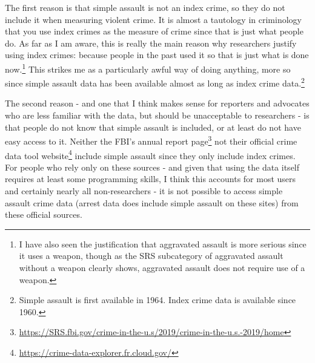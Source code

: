 \documentclass[
]{krantz}
\renewcommand{\href}[2]{#2\footnote{\url{#1}}}
\begin{document}
The first reason is that simple assault is not an index
crime, so they do not include it when measuring violent
crime. It is almost a tautology in criminology that you use
index crimes as the measure of crime since that is just what
people do. As far as I am aware, this is really the main
reason why researchers justify using index crimes: because
people in the past used it so that is just what is done
now.\footnote{I have also seen the justification that
  aggravated assault is more serious since it uses a weapon,
  though as the SRS subcategory of aggravated assault
  without a weapon clearly shows, aggravated assault does
  not require use of a weapon.} This strikes me as a
particularly awful way of doing anything, more so since
simple assault data has been available almost as long as
index crime data.\footnote{Simple assault is first available
  in 1964. Index crime data is available since 1960.}

The second reason - and one that I think makes sense for
reporters and advocates who are less familiar with the data,
but should be unacceptable to researchers - is that people
do not know that simple assault is included, or at least do
not have easy access to it. Neither the FBI's annual report
\href{https://SRS.fbi.gov/crime-in-the-u.s/2019/crime-in-the-u.s.-2019/home}{page}
not their official
\href{https://crime-data-explorer.fr.cloud.gov/}{crime data
tool website} include simple assault since they only include
index crimes. For people who rely only on these sources -
and given that using the data itself requires at least some
programming skills, I think this accounts for most users and
certainly nearly all non-researchers - it is not possible to
access simple assault crime data (arrest data does include
simple assault on these sites) from these official sources.
\end{document}
